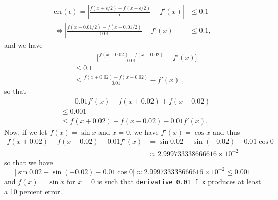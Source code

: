 \documentclass{article}
\begin{document}
\begin{itemize}
\begin{equation*}
\begin{split}
            \text{err}(\epsilon) = \left| \frac{f(x + \epsilon/2) - f(x - \epsilon/2)}{\epsilon} - 
            f'(x) \right|
            &\leq 0.1 \\
            \Leftrightarrow \left| \frac{f(x + 0.01/2) - f(x - 0.01/2)}{0.01} - f'(x) \right| 
            &\leq 0.1,
        \end{split}
    \end{equation*}
    and we have
    \begin{equation*}
        \begin{split}
            &\qquad -\biggl[\frac{f(x + 0.02) - f(x - 0.02)}{0.01} - f'(x)\biggr] \\
            &\leq 0.1 \\ 
            &\leq \frac{f(x + 0.02) - f(x - 0.02)}{0.01} - f'(x)], 
        \end{split}
    \end{equation*}
    so that
    \begin{equation*}
        \begin{split}
            &\qquad 0.01f'(x) - f(x + 0.02) + f(x - 0.02) \\ 
            &\leq 0.001 \\
            &\leq f(x + 0.02) - f(x - 0.02) - 0.01f'(x).
        \end{split}
    \end{equation*}
    \qquad Now, if we let $f(x) = \sin{x}$ and $x = 0$, we have $f'(x) = \cos{x}$ and thus
    \begin{equation*}
        \begin{split}
            f(x + 0.02) - f(x - 0.02) - 0.01f'(x)
            &= \sin{0.02} - \sin{(-0.02)} - 0.01\cos{0} \\
            &\approx 2.999733338666616 \times {10}^{-2}
        \end{split}
    \end{equation*}
    so that we have
    \[
        \left| \sin{0.02} - \sin{(-0.02)} - 0.01\cos{0} \right|
        \approx 2.999733338666616 \times {10}^{-2} \leq 0.001
    \]
    and $f(x) = \sin{x}$ for $x = 0$ is such that \verb|derivative 0.01 f x| produces at least a 
    10 percent error.
\end{itemize}   %
\end{document}
